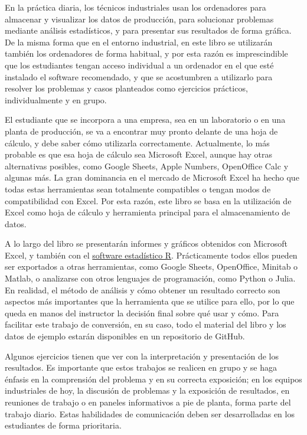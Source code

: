 \documentclass[
  letterpaper,
  DIV=11,
  numbers=noendperiod,
  oneside]{scrreprt}
\begin{document}

En la práctica diaria, los técnicos industriales usan los ordenadores
para almacenar y visualizar los datos de producción, para solucionar
problemas mediante análisis estadísticos, y para presentar sus
resultados de forma gráfica. De la misma forma que en el entorno
industrial, en este libro se utilizarán también los ordenadores de forma
habitual, y por esta razón es imprescindible que los estudiantes tengan
acceso individual a un ordenador en el que esté instalado el software
recomendado, y que se acostumbren a utilizarlo para resolver los
problemas y casos planteados como ejercicios prácticos, individualmente
y en grupo.

El estudiante que se incorpora a una empresa, sea en un laboratorio o en
una planta de producción, se va a encontrar muy pronto delante de una
hoja de cálculo, y debe saber cómo utilizarla correctamente.
Actualmente, lo más probable es que esa hoja de cálculo sea Microsoft
Excel, aunque hay otras alternativas posibles, como Google Sheets, Apple
Numbers, OpenOffice Calc y algunas más. La gran dominancia en el mercado
de Microsoft Excel ha hecho que todas estas herramientas sean totalmente
compatibles o tengan modos de compatibilidad con Excel. Por esta razón,
este libro se basa en la utilización de Excel como hoja de cálculo y
herramienta principal para el almacenamiento de datos.

A lo largo del libro se presentarán informes y gráficos obtenidos con
Microsoft Excel, y también con el
\href{https://en.wikipedia.org/wiki/R_\%28programming_language\%29}{software
estadístico R}. Prácticamente todos ellos pueden ser exportados a otras
herramientas, como Google Sheets, OpenOffice, Minitab o Matlab, o
analizarse con otros lenguajes de programación, como Python o Julia. En
realidad, el método de análisis y cómo obtener un resultado correcto son
aspectos más importantes que la herramienta que se utilice para ello,
por lo que queda en manos del instructor la decisión final sobre qué
usar y cómo. Para facilitar este trabajo de conversión, en su caso, todo
el material del libro y los datos de ejemplo estarán disponibles en un
repositorio de GitHub.

Algunos ejercicios tienen que ver con la interpretación y presentación
de los resultados. Es importante que estos trabajos se realicen en grupo
y se haga énfasis en la comprensión del problema y en su correcta
exposición; en los equipos industriales de hoy, la discusión de
problemas y la exposición de resultados, en reuniones de trabajo o en
paneles informativos a pie de planta, forma parte del trabajo diario.
Estas habilidades de comunicación deben ser desarrolladas en los
estudiantes de forma prioritaria.
\end{document}
